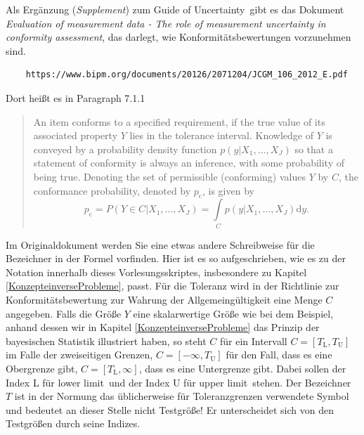 Als Ergänzung (\textsl{Supplement}) zum \glqq Guide of Uncertainty\grqq ~gibt es das Dokument
\textsl{Evaluation of measurement data - The role of measurement uncertainty in conformity assessment},
das darlegt, wie Konformitätsbewertungen vorzunehmen sind.
\begin{verbatim}
	https://www.bipm.org/documents/20126/2071204/JCGM_106_2012_E.pdf
\end{verbatim}
Dort heißt es in Paragraph 7.1.1
\begin{quote}
	An item conforms to a specified requirement,
	if the true value of its associated property $Y$ lies in the tolerance
	interval. Knowledge of $Y$ is conveyed by a probability density function $p(y|{X_1,\dots,X_J})$
	so that a statement of conformity is always an inference,
	with some probability of being true. Denoting the set of permissible (conforming) values
	$Y$ by $C$, the conformance probability, denoted by $p_\mathrm{c}$, is given by
	\begin{equation}
		p_\mathrm{c} = P(Y \in C | {X_1,\dots,X_J}) = \int\limits_C p(y|{X_1,\dots,X_J}) \mathrm{d}y.
	\end{equation}
\end{quote}
Im Originaldokument werden Sie eine etwas andere Schreibweise für die Bezeichner in der Formel vorfinden.
Hier ist es so aufgeschrieben, wie es zu der Notation innerhalb dieses Vorlesungsskriptes, insbesondere
zu Kapitel \ref{KonzepteinverseProbleme}, passt.
Für die Toleranz wird in der Richtlinie zur Konformitätsbewertung zur Wahrung der Allgemeingültigkeit
eine Menge $C$ angegeben. Falls die Größe $Y$ eine skalarwertige Größe wie bei dem Beispiel, anhand dessen
wir in Kapitel \ref{KonzepteinverseProbleme} das Prinzip der bayesischen Statistik illustriert haben,
so steht $C$ für ein Intervall $C = [T_\mathrm{L}, T_\mathrm{U}]$ im Falle der zweiseitigen
Grenzen, $C = [-\infty, T_\mathrm{U}]$ für den Fall, dass es eine Obergrenze gibt,
$C = [T_\mathrm{L}, \infty]$, dass es eine Untergrenze gibt. Dabei sollen der Index L für \glqq lower
limit\grqq ~und der Index U für \glqq upper limit\grqq ~stehen. Der Bezeichner $T$ ist in der
Normung das üblicherweise für Toleranzgrenzen verwendete Symbol und bedeutet an dieser
Stelle nicht Testgröße! Er unterscheidet sich von den Testgrößen durch seine Indizes.

